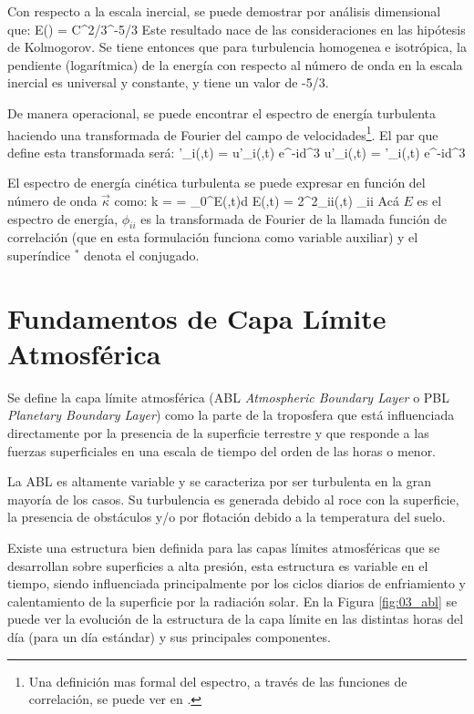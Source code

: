 Con respecto a la escala inercial, se puede demostrar por análisis dimensional que:
\be E(\kappa) = C\varepsilon^{2/3}\kappa^{-5/3} \ee
Este resultado nace de las consideraciones en las hipótesis de Kolmogorov. Se tiene entonces que para turbulencia homogenea e isotrópica, la pendiente (logarítmica) de la energía con respecto al número de onda en la escala inercial es universal y constante, y tiene un valor de -5/3.

De manera operacional, se puede encontrar el espectro de energía turbulenta haciendo una transformada de Fourier del campo de velocidades\footnote{Una definición mas formal del espectro, a través de las funciones de correlación, se puede ver en \cite{9780521775380}.}. El par que define esta transformada será:
\be {}'_i(\vec{\kappa},t) = \int u'_i(,t) e^{-i\vec{\kappa}\cdot{}}d^3 \ee
\be u'_i(,t) = \int {}'_i(\vec{\kappa},t) e^{-i\vec{\kappa}\cdot{}}d^3\vec{\kappa} \ee

El espectro de energía cinética turbulenta se puede expresar en función del número de onda $\vec{\kappa}$ como:
\be 
k =  = \int\limits_0^\infty E(\kappa,t)d\kappa
\ee
\be
E(\kappa,t) = 2\pi\kappa^2\phi_{ii}(\kappa,t)
\ee 
\be 
\phi_{ii} \approx {}
\ee
Acá $E$ es el espectro de energía, $\phi_{ii}$ es la transformada de Fourier de la llamada función de correlación (que en esta formulación funciona como variable auxiliar) y el superíndice $^*$ denota el conjugado.

\newpage 
\section{Fundamentos de Capa Límite Atmosférica}
Se define la capa límite atmosférica (ABL \emph{Atmospheric Boundary Layer} o PBL \emph{Planetary Boundary Layer}) como la parte de la troposfera que está influenciada directamente por la presencia de la superficie terrestre y que responde a las fuerzas superficiales en una escala de tiempo del orden de las horas o menor.

La ABL es altamente variable y se caracteriza por ser turbulenta en la gran mayoría de los casos. Su turbulencia es generada debido al roce con la superficie, la presencia de obstáculos y/o por flotación debido a la temperatura del suelo. 

Existe una estructura bien definida para las capas límites atmosféricas que se desarrollan sobre superficies a alta presión, esta estructura es variable en el tiempo, siendo influenciada principalmente por los ciclos diarios de enfriamiento y calentamiento de la superficie por la radiación solar. En la Figura \ref{fig:03_abl} se puede ver la evolución de la estructura de la capa límite en las distintas horas del día (para un día estándar) y sus principales componentes.

